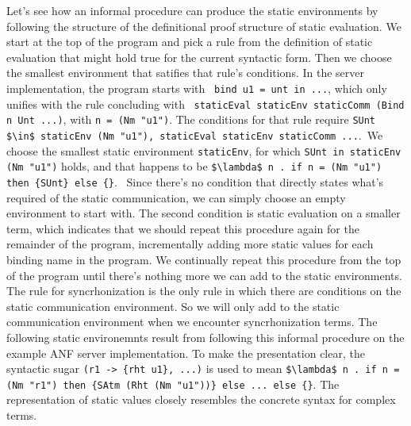 \documentclass[letterpaper, 11pt]{extarticle}
\begin{document}
Let's see how an informal procedure can produce the static environments by following the
structure of the definitional proof structure of static evaluation.
We start at the top of the program and pick a
rule from the definition of static evaluation that might hold true for the current syntactic form.
Then we choose the smallest environment that satifies that rule's conditions. 
In the server implementation, the program starts with \
\lstinline[language=normal_lang, mathescape]{bind u1 = unt in ...}, which only unifies with 
the rule concluding with \
\lstinline[language=logic, mathescape]{staticEval staticEnv staticComm (Bind n Unt ...)},
with \lstinline[language=logic, mathescape]{n = (Nm "u1")}. 
The conditions for that rule require 
\lstinline[language=logic, mathescape]{SUnt $\in$ staticEnv (Nm "u1"), staticEval staticEnv staticComm ...}.\
We choose the smallest static environment \lstinline{staticEnv}, for which
\lstinline[language=logic]{SUnt in staticEnv (Nm "u1")} holds, and that happens to be 
\lstinline[language=logic]|$\lambda$ n . if n = (Nm "u1") then {SUnt} else {}|. \
Since there's no condition that directly states what's required of the static communication, we can
simply choose an empty environment to start with. The second condition is static evaluation on
a smaller term, which indicates that we should repeat this procedure again for the remainder of
the program, incrementally adding more static values for each binding name in the program.
We continually repeat this procedure from the top of the program until there's
nothing more we can add to the static environments.
The rule for syncrhonization is the only rule in which there are conditions on
the static communication environment. So we will only add to the static communication
environment when we encounter syncrhonization terms.
The following static environemnts result from following this informal procedure on
the example ANF server implementation.
To make the presentation clear, the syntactic sugar \lstinline|(r1 -> {rht u1}, ...)| is used 
to mean \lstinline[language=logic]|$\lambda$ n . if n = (Nm "r1") then {SAtm (Rht (Nm "u1"))} else ... else {}|.
The representation of static values closely resembles the concrete syntax for complex terms.
\end{document}
